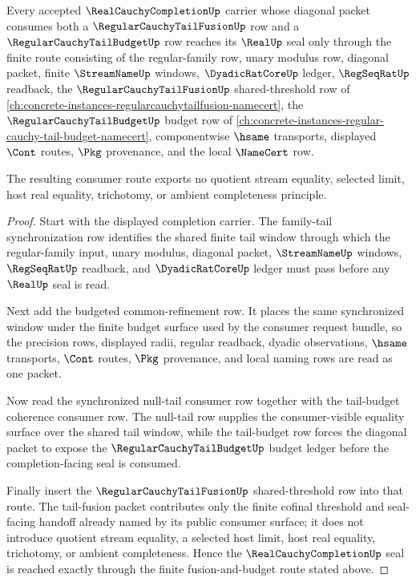 \begin{theorem}
\label{thm:real-cauchy-completion-tail-fusion-budget-consumer}
Every accepted $\RealCauchyCompletionUp$ carrier whose diagonal packet consumes both a $\RegularCauchyTailFusionUp$ row and a $\RegularCauchyTailBudgetUp$ row reaches its $\RealUp$ seal only through the finite route consisting of the regular-family row, unary modulus row, diagonal packet, finite $\StreamNameUp$ windows, $\DyadicRatCoreUp$ ledger, $\RegSeqRatUp$ readback, the $\RegularCauchyTailFusionUp$ shared-threshold row of \autoref{ch:concrete-instances-regularcauchytailfusion-namecert}, the $\RegularCauchyTailBudgetUp$ budget row of \autoref{ch:concrete-instances-regular-cauchy-tail-budget-namecert}, componentwise $\hsame$ transports, displayed $\Cont$ routes, $\Pkg$ provenance, and the local $\NameCert$ row.

The resulting consumer route exports no quotient stream equality, selected limit, host real equality, trichotomy, or ambient completeness principle.
\end{theorem}
\begin{proof}
Start with the displayed completion carrier. The family-tail synchronization row identifies the shared finite tail window through which the regular-family input, unary modulus, diagonal packet, $\StreamNameUp$ windows, $\RegSeqRatUp$ readback, and $\DyadicRatCoreUp$ ledger must pass before any $\RealUp$ seal is read.

Next add the budgeted common-refinement row. It places the same synchronized window under the finite budget surface used by the consumer request bundle, so the precision rows, displayed radii, regular readback, dyadic observations, $\hsame$ transports, $\Cont$ routes, $\Pkg$ provenance, and local naming rows are read as one packet.

Now read the synchronized null-tail consumer row together with the tail-budget coherence consumer row. The null-tail row supplies the consumer-visible equality surface over the shared tail window, while the tail-budget row forces the diagonal packet to expose the $\RegularCauchyTailBudgetUp$ budget ledger before the completion-facing seal is consumed.

Finally insert the $\RegularCauchyTailFusionUp$ shared-threshold row into that route. The tail-fusion packet contributes only the finite cofinal threshold and seal-facing handoff already named by its public consumer surface; it does not introduce quotient stream equality, a selected host limit, host real equality, trichotomy, or ambient completeness. Hence the $\RealCauchyCompletionUp$ seal is reached exactly through the finite fusion-and-budget route stated above.
\end{proof}

